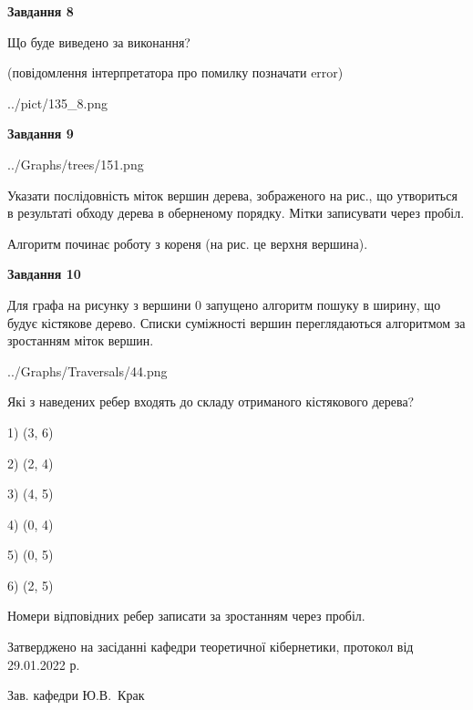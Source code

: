 \documentclass[12pt, ukrainian]{article}
\begin{document}
{\begin {large}
{\begin {center}\textbf{Завдання 8}\end {center}}\par
Що буде виведено за виконання?\par
 (повідомлення інтерпретатора про помилку позначати error)\par
\begin{center}
	{../pict/135_8.png}
\end{center}
\newpage

{\begin {center}\textbf{Завдання 9}\end {center}}\par

\begin{center}
	{../Graphs/trees/151.png}
\end{center}
Указати послідовність міток вершин дерева, зображеного на рис., що утвориться в результаті обходу дерева в оберненому порядку. Мітки записувати через пробіл.\par Алгоритм починає роботу з кореня (на рис. це верхня вершина).\par
\newpage

{\begin {center}\textbf{Завдання 10}\end {center}}\par
Для графа на рисунку з вершини 0 запущено алгоритм пошуку в ширину, що будує кістякове дерево. Списки суміжності вершин переглядаються алгоритмом за зростанням міток вершин.\par
\begin{center}
	{../Graphs/Traversals/44.png}
\end{center}
\par Які з наведених ребер входять до складу отриманого кістякового дерева?\par
1) (3, 6)\par
2) (2, 4)\par
3) (4, 5)\par
4) (0, 4)\par
5) (0, 5)\par
6) (2, 5)\par
{\vskip 15pt} Номери відповідних ребер записати за зростанням через пробіл.\par
\newpage


\end {large}
}
{\smallskip \begin {small} Затверджено на засіданні кафедри теоретичної кібернетики, протокол  від   29.01.2022 р.\par\smallskip\smallskip
{\parbox {6.5 cm}{Зав. кафедри \dotfill Ю.В.~Крак}} \end{small}}
\end{document}
